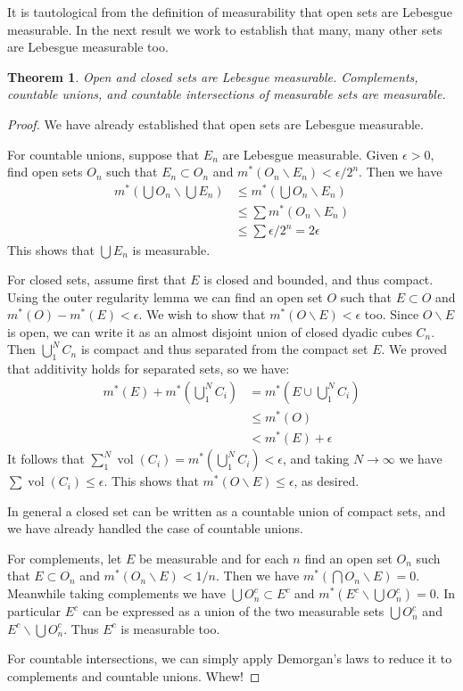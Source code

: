 \documentclass[11pt,oneside]{amsbook}
\renewcommand{\setminus}{\smallsetminus}
\DeclareMathOperator{\vol}{vol}
\theoremstyle{definition}
\theoremstyle{plain}
\newtheorem{thm}{Theorem}[section]
\theoremstyle{definition}
\theoremstyle{remark}
\numberwithin{equation}{section}
\numberwithin{figure}{section}
\begin{document}
It is tautological from the definition of measurability that open sets are Lebesgue measurable. In the next result we work to establish that many, many other sets are Lebesgue measurable too.

\begin{thm}
  Open and closed sets are Lebesgue measurable. Complements, countable unions, and countable intersections of measurable sets are measurable.
\end{thm}

\begin{proof}
  We have already established that open sets are Lebesgue measurable.

  For countable unions, suppose that $E_n$ are Lebesgue measurable. Given $\epsilon>0$, find open sets $O_n$ such that $E_n\subset O_n$ and $m^*(O_n\setminus E_n)<\epsilon/2^n$. Then we have
  \begin{align*}
    m^*(\bigcup O_n\smallsetminus\bigcup E_n)
    &\leq m^*(\bigcup O_n\setminus E_n)\\
    &\leq \sum m^*(O_n\setminus E_n)\\
    &\leq \sum \epsilon/2^n=2\epsilon
  \end{align*}
  This shows that $\bigcup E_n$ is measurable.

  For closed sets, assume first that $E$ is closed and bounded, and thus compact. Using the outer regularity lemma we can find an open set $O$ such that $E\subset O$ and $m^*(O)-m^*(E)<\epsilon$. We wish to show that $m^*(O\setminus E)<\epsilon$ too. Since $O\setminus E$ is open, we can write it as an almost disjoint union of closed dyadic cubes $C_n$. Then $\bigcup_1^N C_n$ is compact and thus separated from the compact set $E$. We proved that additivity holds for separated sets, so we have:
  \begin{align*}
    m^*(E)+m^*(\bigcup_1^NC_i)&=m^*(E\cup\bigcup_1^NC_i)\\
                              &\leq m^*(O)\\
                              &<m^*(E)+\epsilon
  \end{align*}
  It follows that $\sum_1^N\vol(C_i)=m^*(\bigcup_1^NC_i)<\epsilon$, and taking $N\to\infty$ we have $\sum\vol(C_i)\leq\epsilon$. This shows that $m^*(O\setminus E)\leq\epsilon$, as desired.

  In general a closed set can be written as a countable union of compact sets, and we have already handled the case of countable unions.

  For complements, let $E$ be measurable and for each $n$ find an open set $O_n$ such that $E\subset O_n$ and $m^*(O_n\setminus E)<1/n$. Then we have $m^*(\bigcap O_n\setminus E)=0$. Meanwhile taking complements we have $\bigcup O_n^c\subset E^c$ and $m^*(E^c\setminus\bigcup O_n^c)=0$. In particular $E^c$ can be expressed as a union of the two measurable sets $\bigcup O_n^c$ and $E^c\setminus\bigcup O_n^c$. Thus $E^c$ is measurable too.

  For countable intersections, we can simply apply Demorgan's laws to reduce it to complements and countable unions. Whew!
\end{proof}
\end{document}
